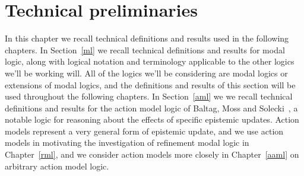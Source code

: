\chapter{Technical preliminaries}\label{technical}

In this chapter we recall technical definitions and results used in the following chapters.
In Section~\ref{ml} we recall technical definitions and results for modal logic, along with logical notation and terminology applicable to the other logics we'll be working will.
All of the logics we'll be considering are modal logics or extensions of modal logics, and the definitions and results of this section will be used throughout the following chapters. 
In Section~\ref{aml} we we recall technical definitions and results for the action model logic of Baltag, Moss and Solecki~\cite{baltag:1998,baltag:2004}, a notable logic for reasoning about the effects of specific epistemic updates.
Action models represent a very general form of epistemic update, and we use action models in motivating the investigation of refinement modal logic in Chapter~\ref{rml}, and we consider action models more closely in Chapter~\ref{aaml} on arbitrary action model logic.



